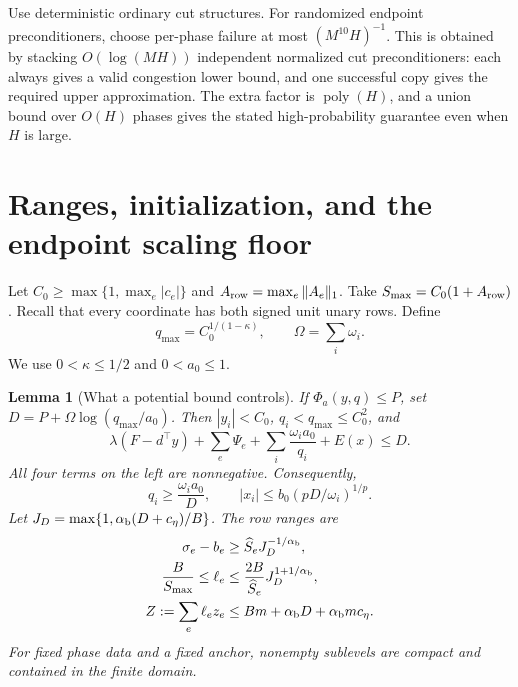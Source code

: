 \documentclass[11pt]{article}
\newtheorem{lemma}[theorem]{Lemma}
\theoremstyle{definition}\newtheorem{definition}[theorem]{Definition}
\theoremstyle{remark}\newtheorem{remark}[theorem]{Remark}
\newcommand{\poly}{\operatorname{poly}}
\begin{document}
Use deterministic ordinary cut structures. For randomized endpoint
preconditioners, choose per-phase failure at most $(M^{10}H)^{-1}$.
This is obtained by stacking $O(\log(MH))$ independent normalized
cut preconditioners: each always gives a valid congestion lower bound,
and one successful copy gives the required upper approximation.
The extra factor is $\poly(H)$, and a union bound over $O(H)$ phases
gives the stated high-probability guarantee even when $H$ is large.

\appendix


\section{Ranges, initialization, and the endpoint scaling floor}
\label{sec:paired-unary-ranges}

Let $C_0\ge\max\{1,\max_e|c_e|\}$ and
$A_{\rm row}=\max_e\|A_e\|_1$.  Take
$S_{\max}=C_0(1+A_{\rm row})$.  Recall that every coordinate has
both signed unit unary rows.  Define
\[
 q_{\max}=C_0^{1/(1-\kappa)},\qquad \Omega=\sum_i\omega_i.
\]
We use $0<\kappa\le1/2$ and $0<a_0\le1$.

\begin{lemma}[What a potential bound controls]
\label{lem:sublevel-ranges}
If $\Phi_a(y,q)\le P$, set $D=P+\Omega\log(q_{\max}/a_0)$.
Then $|y_i|<C_0$, $q_i<q_{\max}\le C_0^2$, and
\begin{equation}\label{eq:positive-budget}
 \lambda(F-d^\top y)+\sum_e\Psi_e
       +\sum_i\frac{\omega_i a_0}{q_i}+E(x)\le D.
\end{equation}
All four terms on the left are nonnegative.  Consequently,
\begin{equation}\label{eq:lower-q-range}
 q_i\ge\frac{\omega_i a_0}{D},\qquad
 |x_i|\le b_0(pD/\omega_i)^{1/p}.
\end{equation}
Let $J_D=\max\{1,\alpha_{\rm b}(D+c_\eta)/B\}$.  The row ranges are
\begin{align}
 \sigma_e-b_e&\ge\widehat S_eJ_D^{-1/\alpha_{\rm b}},
 \label{eq:finite-domain-margin}\\
 \frac B{S_{\max}}\le\ell_e
 &\le\frac{2B}{\widehat S_e}J_D^{1+1/\alpha_{\rm b}},
 \label{eq:ell-range}\\
 Z:=\sum_e\ell_ez_e&\le Bm+\alpha_{\rm b}D+\alpha_{\rm b}mc_\eta.
 \label{eq:root-moment}
\end{align}
For fixed phase data and a fixed anchor, nonempty sublevels are compact
and contained in the finite domain.
\end{lemma}
\end{document}
